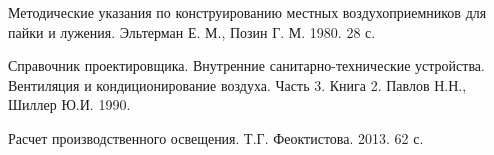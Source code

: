    Методические указания по конструированию
                                        местных воздухоприемников для пайки и лужения.
                                        Эльтерман Е. М., Позин Г. М.
                                        1980. 28 с.

  Справочник проектировщика.
                                            Внутренние санитарно-технические устройства.
                                            Вентиляция и кондиционирование воздуха.
                                            Часть 3. Книга 2.
                                            Павлов Н.Н., Шиллер Ю.И.
                                            1990.

  Расчет производственного освещения.
                                Т.Г. Феоктистова.
                                2013. 62 с.
